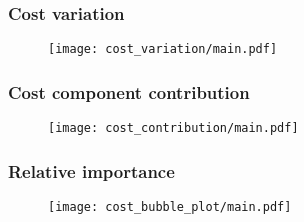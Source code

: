 \begin{frame}
    \frametitle{Cost variation}

    \begin{figure}
    \texttt{[image: cost\_variation/main.pdf]}
    \end{figure}
\end{frame}

\begin{frame}
    \frametitle{Cost component contribution}

    \begin{figure}
    \texttt{[image: cost\_contribution/main.pdf]}
    \end{figure}
\end{frame}

\begin{frame}
    \frametitle{Relative importance}

    \begin{figure}
        \texttt{[image: cost\_bubble\_plot/main.pdf]}
    \end{figure}
\end{frame}

